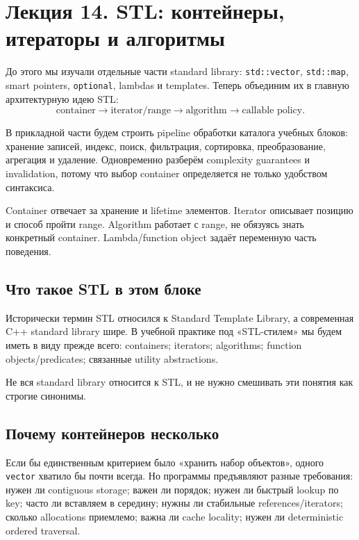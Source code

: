 \section{Лекция 14. STL: контейнеры, итераторы и алгоритмы}
\label{sec:lecture-14}

До этого мы изучали отдельные части standard library:
\texttt{std::vector}, \texttt{std::map}, smart pointers, \texttt{optional},
lambdas и templates. Теперь объединим их в главную архитектурную идею STL:
\[
\text{container}
\rightarrow
\text{iterator/range}
\rightarrow
\text{algorithm}
\rightarrow
\text{callable policy}.
\]

В прикладной части будем строить pipeline обработки каталога учебных блоков:
хранение записей, индекс, поиск, фильтрация, сортировка, преобразование,
агрегация и удаление. Одновременно разберём complexity guarantees и invalidation,
потому что выбор container определяется не только удобством синтаксиса.

\begin{importantbox}
Container отвечает за хранение и lifetime элементов. Iterator описывает позицию
и способ пройти range. Algorithm работает с range, не обязуясь знать конкретный
container. Lambda/function object задаёт переменную часть поведения.
\end{importantbox}

\subsection{Что такое STL в этом блоке}

Исторически термин STL относился к Standard Template Library, а современная
C++ standard library шире. В учебной практике под «STL-стилем» мы будем иметь в
виду прежде всего:
containers; iterators; algorithms; function objects/predicates; связанные utility abstractions.

Не вся standard library относится к STL, и не нужно смешивать эти понятия как
строгие синонимы.

\subsection{Почему контейнеров несколько}

Если бы единственным критерием было «хранить набор объектов», одного
\texttt{vector} хватило бы почти всегда. Но программы предъявляют разные
требования:
нужен ли contiguous storage; важен ли порядок; нужен ли быстрый lookup по key; часто ли вставляем в середину; нужны ли стабильные references/iterators; сколько allocations приемлемо; важна ли cache locality; нужен ли deterministic ordered traversal.

